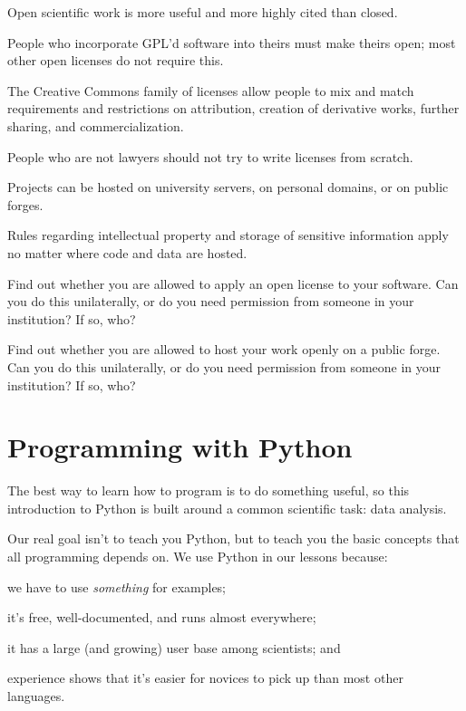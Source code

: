 \documentclass{book}
\begin{document}
\begin{keypoints}
\begin{swcitemize}
\item
  Open scientific work is more useful and more highly cited than closed.
\item
  People who incorporate GPL'd software into theirs must make theirs
  open; most other open licenses do not require this.
\item
  The Creative Commons family of licenses allow people to mix and match
  requirements and restrictions on attribution, creation of derivative
  works, further sharing, and commercialization.
\item
  People who are not lawyers should not try to write licenses from
  scratch.
\item
  Projects can be hosted on university servers, on personal domains, or
  on public forges.
\item
  Rules regarding intellectual property and storage of sensitive
  information apply no matter where code and data are hosted.
\end{swcitemize}
\end{keypoints}

\begin{challenge}
  Find out whether you are allowed to apply an open license to your
  software. Can you do this unilaterally, or do you need permission from
  someone in your institution? If so, who?
\end{challenge}

\begin{challenge}
  Find out whether you are allowed to host your work openly on a public
  forge. Can you do this unilaterally, or do you need permission from
  someone in your institution? If so, who?
\end{challenge}

\chapter{Programming with Python}\label{s:python}

The best way to learn how to program is to do something useful, so this
introduction to Python is built around a common scientific task: data
analysis.

Our real goal isn't to teach you Python, but to teach you the basic
concepts that all programming depends on. We use Python in our lessons
because:

\begin{swcenumerate}
\item
  we have to use \emph{something} for examples;
\item
  it's free, well-documented, and runs almost everywhere;
\item
  it has a large (and growing) user base among scientists; and
\item
  experience shows that it's easier for novices to pick up than most
  other languages.
\end{swcenumerate}
\end{document}
